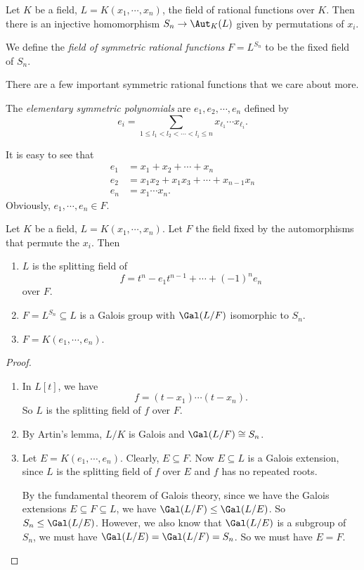 \documentclass[a4paper]{article}
\begin{document}
\begin{defi}
  Let $K$ be a field, $L = K(x_1, \cdots, x_n)$, the field of rational functions over $K$. Then there is an injective homomorphism $S_n \to \Aut_K(L)$ given by permutations of $x_i$.

  We define the \emph{field of symmetric rational functions} $F = L^{S_n}$ to be the fixed field of $S_n$.
\end{defi}

There are a few important symmetric rational functions that we care about more.
\begin{defi}
  The \emph{elementary symmetric polynomials} are $e_1, e_2, \cdots, e_n$ defined by
  \[
    e_i = \sum_{1 \leq l_1 < l_2 < \cdots < l_i \leq n} x_{\ell_1} \cdots x_{\ell_i}.
  \]
\end{defi}
It is easy to see that
\begin{align*}
  e_1 &= x_1 + x_2 + \cdots + x_n\\
  e_2 &= x_1x_2 + x_1x_3 + \cdots + x_{n - 1}x_n\\
  e_n &= x_1\cdots x_n.
\end{align*}
Obviously, $e_1, \cdots, e_n \in F$.

\begin{thm}
  Let $K$ be a field, $L = K(x_1, \cdots, x_n)$. Let $F$ the field fixed by the automorphisms that permute the $x_i$. Then
  \begin{enumerate}
    \item $L$ is the splitting field of
      \[
        f = t^n - e_1 t^{n - 1} + \cdots + (-1)^n e_n
      \]
      over $F$.
    \item $F = L^{S_n} \subseteq L$ is a Galois group with $\Gal(L/F)$ isomorphic to $S_n$.
    \item $F = K(e_1, \cdots, e_n)$.
  \end{enumerate}
\end{thm}

\begin{proof}\leavevmode
  \begin{enumerate}
    \item In $L[t]$, we have
      \[
        f = (t - x_1)\cdots (t - x_n).
      \]
      So $L$ is the splitting field of $f$ over $F$.
    \item By Artin's lemma, $L/K$ is Galois and $\Gal(L/F) \cong S_n$.
    \item Let $E = K(e_1, \cdots, e_n)$. Clearly, $E \subseteq F$. Now $E\subseteq L$ is a Galois extension, since $L$ is the splitting field of $f$ over $E$ and $f$ has no repeated roots.

      By the fundamental theorem of Galois theory, since we have the Galois extensions $E\subseteq F \subseteq L$, we have $\Gal(L/F) \leq \Gal(L/E)$. So $S_n \leq \Gal(L/E)$. However, we also know that $\Gal(L/E)$ is a subgroup of $S_n$, we must have $\Gal(L/E) = \Gal(L/F) = S_n$. So we must have $E = F$.
  \end{enumerate}
\end{proof}
\end{document}
